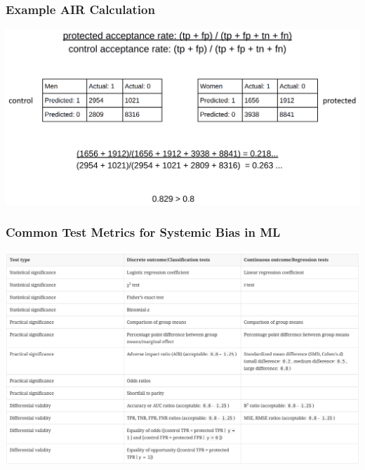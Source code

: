 \documentclass[11pt,aspectratio=169,hyperref={colorlinks}]{beamer}
\begin{document}
		\begin{frame}				
		
			\frametitle{Example AIR Calculation}
			
			\centering
			\includegraphics[scale=0.15]{../img/air2.png}
			
		\end{frame}	
		
		\begin{frame}				
		
			\frametitle{Common Test Metrics for Systemic Bias in ML}
			
			\centering
			\includegraphics[scale=0.13]{../img/bias_metrics.png}
			
		\end{frame}		
		
\end{document}

